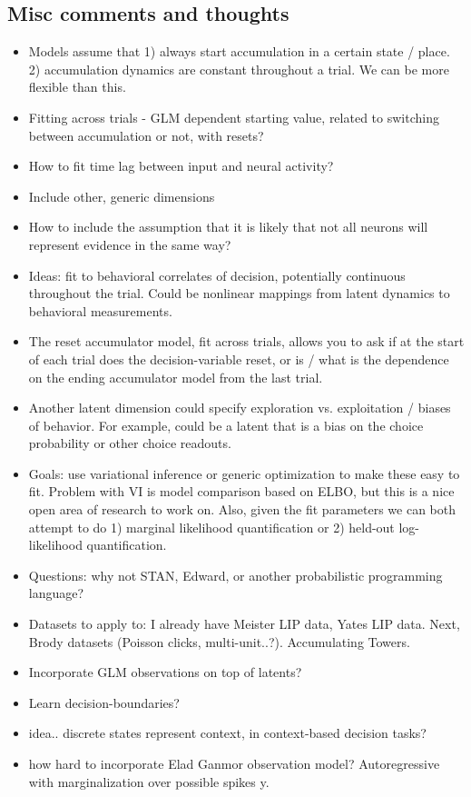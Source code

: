 \documentclass{article}
\begin{document}
\subsection{Misc comments and thoughts}
\begin{itemize}
\item Models assume that 1) always start accumulation in a certain state / place. 2) accumulation dynamics are constant throughout a trial. We can be more flexible than this. 
\item Fitting across trials - GLM dependent starting value, related to switching between accumulation or not, with resets?
\item How to fit time lag between input and neural activity? 
\item Include other, generic dimensions 
\item How to include the assumption that it is likely that not all neurons will represent evidence in the same way? 
\item Ideas: fit to behavioral correlates of decision, potentially continuous throughout the trial. Could be nonlinear mappings from latent dynamics to behavioral measurements. 
\item The reset accumulator model, fit across trials, allows you to ask if at the start of each trial does the decision-variable reset, or is / what is the dependence on the ending accumulator model from the last trial. 
\item Another latent dimension could specify exploration vs. exploitation / biases of behavior. For example, could be a latent that is a bias on the choice probability or other choice readouts. 
\item Goals: use variational inference or generic optimization to make these easy to fit. Problem with VI is model comparison based on ELBO, but this is a nice open area of research to work on. Also, given the fit parameters we can both attempt to do 1) marginal likelihood quantification or 2) held-out log-likelihood quantification. 
\item Questions: why not STAN, Edward, or another probabilistic programming language? 
\item Datasets to apply to: I already have Meister LIP data, Yates LIP data. Next, Brody datasets (Poisson clicks, multi-unit..?). Accumulating Towers. 
\item Incorporate GLM observations on top of latents? 
\item Learn decision-boundaries?
\item idea.. discrete states represent context, in context-based decision tasks? 
\item how hard to incorporate Elad Ganmor observation model? Autoregressive with marginalization over possible spikes y. 
\end{itemize}
\end{document}
